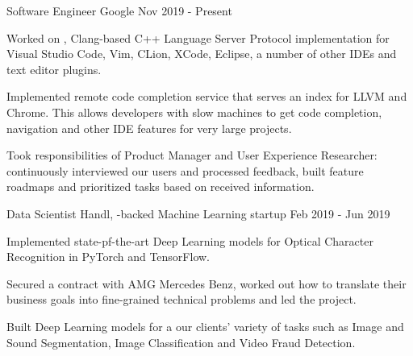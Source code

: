 
\begin{cventries}

  \cventry
    {Software Engineer}
    {Google}
    {}
    {Nov 2019 - Present}
    {
      \begin{cvitems}
        \item Worked on , Clang-based
          C++ Language Server Protocol implementation for Visual Studio Code,
          Vim, CLion, XCode, Eclipse, a number of other IDEs and text editor
          plugins.
        \item Implemented remote code completion service that serves an index for
          LLVM and Chrome. This allows developers with slow machines to get
          code completion, navigation and other IDE features for very large
          projects.
        \item Took responsibilities of Product Manager and User Experience
          Researcher: continuously interviewed our users and processed
          feedback, built feature roadmaps and prioritized tasks based on
          received information.
      \end{cvitems}
    }

  \cventry
    {Data Scientist}
    {Handl, -backed Machine
     Learning startup}
    {}
    {Feb 2019 - Jun 2019}
    {
      \begin{cvitems}
        \item Implemented state-pf-the-art Deep Learning models for Optical
          Character Recognition in PyTorch and TensorFlow.
        \item Secured a contract with AMG Mercedes Benz, worked out how to
          translate their business goals into fine-grained technical problems
          and led the project.
        \item Built Deep Learning models for a our clients' variety of tasks
          such as Image and Sound Segmentation, Image Classification and Video
          Fraud Detection.
      \end{cvitems}
    }


\end{cventries}
